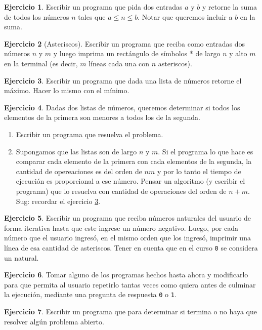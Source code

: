 \documentclass[a4paper,12pt]{book}
\theoremstyle{definition}
\newtheorem{ejercicio}{Ejercicio}
\begin{document}
	\begin{ejercicio}
		Escribir un programa que pida dos entradas $a$ y $b$ y retorne la suma de todos los números $n$ tales que $a\leq n\leq b$. Notar que queremos incluir a $b$ en la suma.
	\end{ejercicio}
	\begin{ejercicio}[Asteriscos]
		Escribir un programa que reciba como entradas dos números $n$ y $m$ y luego imprima un rectángulo de símbolos * de largo $n$ y alto $m$ en la terminal (es decir, $m$ líneas cada una con $n$ asteriscos).
	\end{ejercicio}
	\begin{ejercicio}\label{ejer-elemMax}
		Escribir un programa que dada una lista de números retorne el máximo. Hacer lo mismo con el mínimo.
	\end{ejercicio}
	\begin{ejercicio} Dadas dos listas de números, queremos determinar si todos los elementos de la primera son menores a todos los de la segunda.
		\begin{enumerate}
			\item Escribir un programa que resuelva el problema.
			\item Supongamos que las listas son de largo $n$ y $m$. Si el programa lo que hace es comparar cada elemento de la primera con cada elementos de la segunda, la cantidad de opereaciones es del orden de $nm$ y por lo tanto el tiempo de ejecución es proporcional a ese número. Pensar un algoritmo (y escribir el programa) que lo resuelva con cantidad de operaciones del orden de $n+m$. Sug: recordar el ejercicio \ref{ejer-elemMax}.
		\end{enumerate}
	\end{ejercicio}
	\begin{ejercicio}
		Escribir un programa que reciba números naturales del usuario de forma iterativa hasta que este ingrese un número negativo. Luego, por cada número que el usuario ingresó, en el mismo orden que los ingresó, imprimir una línea de esa cantidad de asteriscos. Tener en cuenta que en el curso {\tt 0} se considera un natural.
	\end{ejercicio}
	\begin{ejercicio}
		Tomar alguno de los programas hechos hasta ahora y modificarlo para que permita al usuario repetirlo tantas veces como quiera antes de culminar la ejecución, mediante una pregunta de respuesta {\tt 0} o {\tt 1}.
	\end{ejercicio}
	\begin{ejercicio}
		Escribir un programa que para determinar si termina o no haya que resolver algún problema abierto.
	\end{ejercicio}
	
\end{document}
